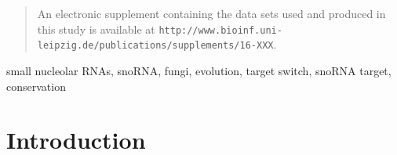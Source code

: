 \documentclass[preprint,3p,times,twocolumn]{elsarticle}
\newcommand{\url}[1]{\texttt{\small #1}}
\begin{document}
\begin{frontmatter}
\begin{abstract}
  
  An electronic supplement containing the data sets used and produced in
  this study is available at
  \url{http://www.bioinf.uni-leipzig.de/publications/supplements/16-XXX}. 
\end{abstract}

\begin{keyword}
  small nucleolar RNAs, snoRNA, fungi, evolution, target switch, snoRNA target, 	
  conservation	
\end{keyword}

\end{frontmatter}


\section{Introduction}
\end{document}
